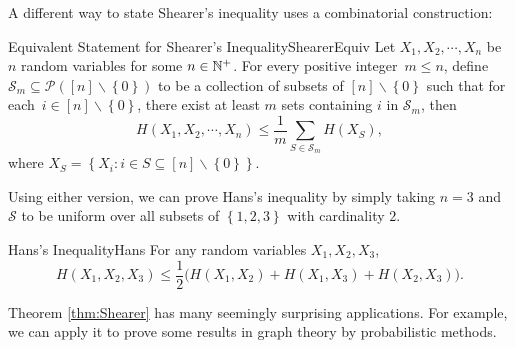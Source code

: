 \documentclass[math, code]{amznotes}
\theoremstyle{remark}
\begin{document}
A different way to state Shearer's inequality uses a combinatorial construction:
\begin{thmbox}{Equivalent Statement for Shearer's Inequality}{ShearerEquiv}
    Let $X_1, X_2, \cdots, X_n$ be $n$ random variables for some $n \in \mathbb{N}^+$. For every positive integer~$m \leq n$, define $\mathcal{S}_m \subseteq \mathcal{P}\left(\left[n\right] \backslash \left\{0\right\}\right)$ to be a collection of subsets of $\left[n\right] \backslash \left\{0\right\}$ such that for each~$i \in \left[n\right] \backslash \left\{0\right\}$, there exist at least $m$ sets containing $i$ in $\mathcal{S}_m$, then
    \begin{equation*}
        H\left(X_1, X_2, \cdots, X_n\right) \leq \frac{1}{m}\sum_{S \in \mathcal{S}_m}H\left(X_{S}\right),
    \end{equation*}
    where $X_{S} = \left\{X_i \colon i \in S \subseteq \left[n\right] \backslash \left\{0\right\}\right\}$.
\end{thmbox}
Using either version, we can prove Hans's inequality by simply taking $n = 3$ and $\mathcal{S}$ to be uniform over all subsets of $\left\{1, 2, 3\right\}$ with cardinality $2$.
\begin{corbox}{Hans's Inequality}{Hans}
    For any random variables $X_1, X_2, X_3$,
    \begin{equation*}
        H\left(X_1, X_2, X_3\right) \leq \frac{1}{2}\bigl(H\left(X_1, X_2\right) + H\left(X_1, X_3\right) + H\left(X_2, X_3\right)\bigr).
    \end{equation*}
\end{corbox}
Theorem \ref{thm:Shearer} has many seemingly surprising applications. For example, we can apply it to prove some results in graph theory by probabilistic methods.
\end{document}
